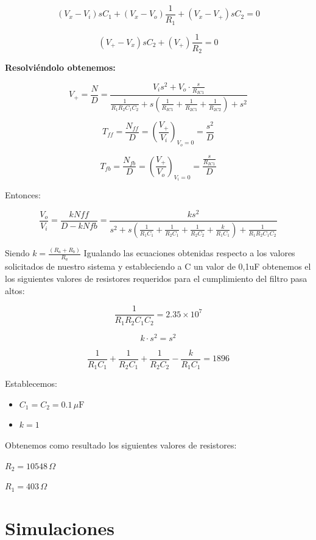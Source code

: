 \[
(V_x - V_i)sC_1 + (V_x - V_o)\frac{1}{R_1} + (V_x - V_+)sC_2 = 0
\]

\[
(V_+ - V_x)sC_2 + (V_+)\frac{1}{R_2} = 0
\]

\textbf{Resolviéndolo obtenemos:}

\[
V_+ = \frac{N}{D} = \frac{V_i s^2 + V_o \cdot \frac{s}{R_{IC1}}}{\frac{1}{R_1 R_2 C_1 C_2} + s \left(\frac{1}{R_{IC1}} + \frac{1}{R_{2C1}} + \frac{1}{R_{2C2}}\right) + s^2}
\]

\[
T_{ff} = \frac{N_{ff}}{D} = \left(\frac{V_+}{V_i}\right)_{V_o=0} = \frac{s^2}{D}
\]

\[
T_{fb} = \frac{N_{fb}}{D} = \left(\frac{V_+}{V_o}\right)_{V_i=0} = \frac{\frac{s}{R_{IC1}}}{D}
\]


\hspace{1mm} Entonces:

\[\frac{V_o}{V_i} = \frac{kNff}{D - kNfb} = \frac{k s^2}{s^2 + s \left( \frac{1}{R_1 C_1} + \frac{1}{R_2 C_1} + \frac{1}{R_2 C_2} + \frac{k}{R_1 C_1} \right) + \frac{1}{R_1 R_2 C_1 C_2}}\]


\hspace{1mm} Siendo \( k = \frac{(R_a + R_b)}{R_a} \) 
\bigskip
\newline
 Igualando las ecuaciones obtenidas respecto a los valores solicitados de nuestro sistema y estableciendo a C un valor de 0,1uF obtenemos el los siguientes valores de resistores requeridos para el cumplimiento del filtro pasa altos:

\[
\frac{1}{R_{\text{1}} R_{\text{2}} C_1 C_2} = 2.35 \times 10^7
\]

\[
k \cdot s^2 = s^2
\]

\[
\frac{1}{R_1 C_1} + \frac{1}{R_2 C_1} + \frac{1}{R_2 C_2} - \frac{k}{R_1 C_1} = 1896
\]

\hspace {1mm}Establecemos:

\begin{itemize}
    \item \( C_1 = C_2 = 0.1 \, \mu \text{F} \)
    \item \( k = 1 \)
\end{itemize}

\hspace{1mm}Obtenemos como resultado los siguientes valores de resistores:

\( R_2 = 10548 \, \Omega \)

\( R_1 = 403 \, \Omega \)

\newpage

\section{Simulaciones}

